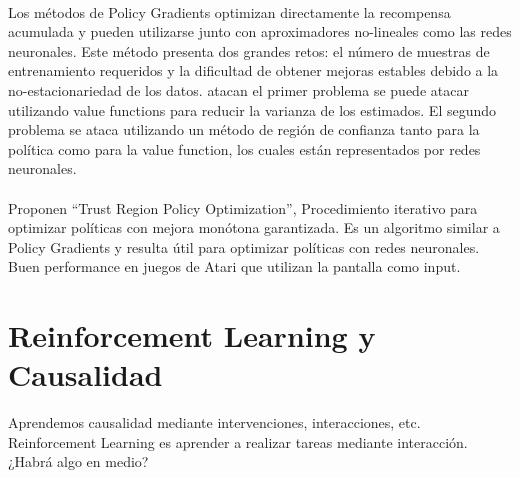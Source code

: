\documentclass[11pt]{article}
\theoremstyle{plain}
\begin{document}
\\
Los métodos de Policy Gradients optimizan directamente la recompensa acumulada y pueden utilizarse junto con aproximadores no-lineales como las redes neuronales. Este método presenta dos grandes retos: el número de muestras de entrenamiento requeridos y la dificultad de obtener mejoras estables debido a la no-estacionariedad de los datos.  \cite{DBLP:journals/corr/SchulmanMLJA15} atacan el primer problema se puede atacar utilizando value functions para reducir la varianza de los estimados. El segundo problema se ataca utilizando un método de región de confianza tanto para la política como para la value function, los cuales están representados por redes neuronales.\\
\\
 \cite{DBLP:journals/corr/SchulmanLMJA15} Proponen “Trust Region Policy Optimization”, Procedimiento iterativo para optimizar políticas con mejora monótona garantizada. Es un algoritmo similar a Policy Gradients y resulta útil para optimizar políticas con redes neuronales. Buen performance en juegos de Atari que utilizan la pantalla como input.

\section{Reinforcement Learning y Causalidad}
Aprendemos causalidad mediante intervenciones, interacciones, etc. Reinforcement Learning es aprender a realizar tareas mediante interacción. ¿Habrá algo en medio?
\end{document}
